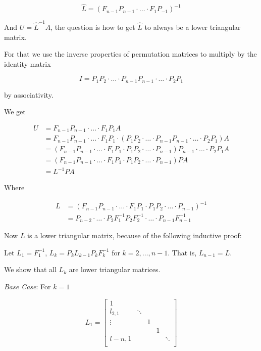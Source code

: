 \[
    \hat{L} = (F_{n - 1} P_{n - 1} \cdot \dots \cdot F_1 P_{-1} )^{-1} 
\]

And \(U = \hat{L}^{-1} A\), the question is how to get \(\hat{L}\) to always be a lower triangular matrix.

For that we use the inverse properties of permutation matrices to multiply by the identity matrix 

\[
    I = P_1 P_2 \cdot \dots \cdot P_{n - 1} P_{n - 1} \cdot \dots \cdot P_2 P_1
\]

by associativity. 

We get 

\begin{align*} 
    U &= F_{n - 1} P_{n - 1} \cdot \dots \cdot F_1 P_1 A \\ 
      &= F_{n - 1} P_{n - 1} \cdot \dots \cdot F_1 P_1 \cdot (P_1 P_2 \cdot \dots \cdot P_{n - 1} P_{n - 1} \cdot \dots \cdot P_2 P_1) A\\ 
      &= (F_{n - 1} P_{n - 1} \cdot \dots \cdot F_1 P_1  \cdot P_1 P_2 \cdot \dots \cdot P_{n - 1}) P_{n - 1} \cdot \dots \cdot P_2 P_1 A\\ 
      &= (F_{n - 1} P_{n - 1} \cdot \dots \cdot F_1 P_1  \cdot P_1 P_2 \cdot \dots \cdot P_{n - 1}) P A\\ 
      & = L^{-1} P A
\end{align*}

Where 

\begin{align*} 
    L &= (F_{n - 1} P_{n - 1} \cdot \dots \cdot F_1 P_1  \cdot P_1 P_2 \cdot \dots \cdot P_{n - 1})^{-1} \\ 
      &=  P_{n - 2} \cdot \dots \cdot P_2 F_{1}^{-1} P_2 F_{2}^{-1} \cdot \dots \cdot P_{n - 1} F_{n - 1}^{-1}
\end{align*}

Now \(L\) is a lower triangular matrix, because of the following inductive proof: 

Let \(L_1 = F_{1}^{-1}\), \(L_k = P_k L_{k -1} P_k F_{k}^{-1}\) for \(k = 2, \dots, n - 1\). That is, \(L_{n  - 1} = L\).

We show that all \(L_k\) are lower triangular matrices.

\emph{Base Case}: For \(k = 1\)

\[
    L_1 = 
        \begin{bmatrix}
            1 &        &         &   &        \\
             l_{2,1}& \ddots &         &   &        \\
             \vdots&        & 1       &   &        \\
            &        &  & 1 &        \\
            l-{n,1} &        &        &   & \ddots \\
        \end{bmatrix}
\]

